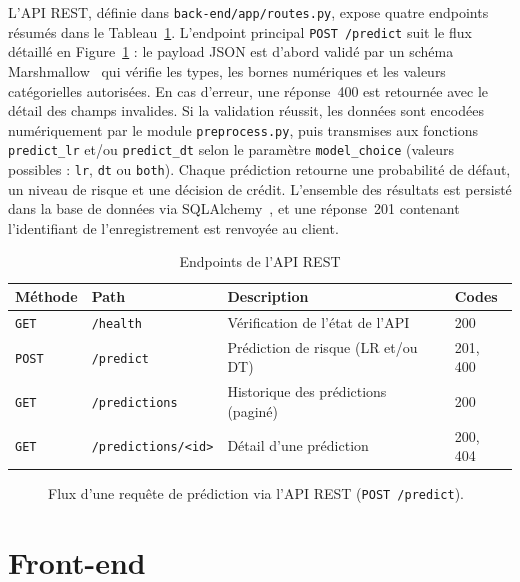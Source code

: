 \documentclass[12pt,a4paper,openany]{report}
\newcommand{\file}[1]{\texttt{#1}}
\begin{document}
L'API REST, définie dans \file{back-end/app/routes.py}, expose quatre endpoints résumés dans le Tableau~\ref{tab:endpoints}. L'endpoint principal \texttt{POST /predict} suit le flux détaillé en Figure~\ref{fig:sequence} : le payload JSON est d'abord validé par un schéma Marshmallow~\cite{marshmallow} qui vérifie les types, les bornes numériques et les valeurs catégorielles autorisées. En cas d'erreur, une réponse~400 est retournée avec le détail des champs invalides. Si la validation réussit, les données sont encodées numériquement par le module \file{preprocess.py}, puis transmises aux fonctions \texttt{predict\_lr} et/ou \texttt{predict\_dt} selon le paramètre \texttt{model\_choice} (valeurs possibles : \texttt{lr}, \texttt{dt} ou \texttt{both}). Chaque prédiction retourne une probabilité de défaut, un niveau de risque et une décision de crédit. L'ensemble des résultats est persisté dans la base de données via SQLAlchemy~\cite{sqlalchemy}, et une réponse~201 contenant l'identifiant de l'enregistrement est renvoyée au client.

\begin{table}[H]
    \centering
    \caption{Endpoints de l'API REST}
    \label{tab:endpoints}
    \begin{tabularx}{\textwidth}{l l X l}
        \toprule
        \textbf{Méthode} & \textbf{Path} & \textbf{Description} & \textbf{Codes} \\
        \midrule
        \texttt{GET}  & \texttt{/health}              & Vérification de l'état de l'API          & 200 \\
        \texttt{POST} & \texttt{/predict}             & Prédiction de risque (LR et/ou DT)       & 201, 400 \\
        \texttt{GET}  & \texttt{/predictions}         & Historique des prédictions (paginé)       & 200 \\
        \texttt{GET}  & \texttt{/predictions/<id>}    & Détail d'une prédiction                  & 200, 404 \\
        \bottomrule
    \end{tabularx}
\end{table}

\begin{figure}[H]
    \centering
    
    \caption{Flux d'une requête de prédiction via l'API REST (\texttt{POST /predict}).}
    \label{fig:sequence}
\end{figure}

\section{Front-end}
\end{document}
